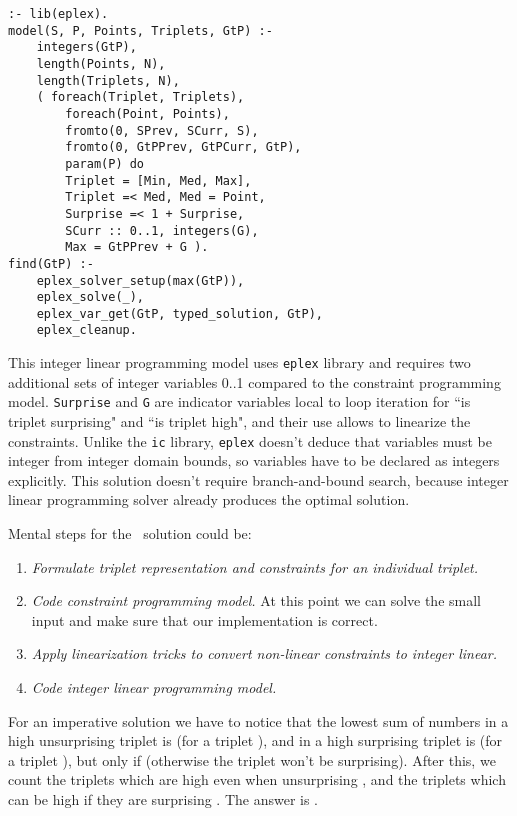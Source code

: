 \documentclass{acm_proc_article-sp}
\begin{document}
\begin{lstlisting}[caption={Integer programming solution for ``Dancing With the Googlers''}]
:- lib(eplex).
model(S, P, Points, Triplets, GtP) :-
    integers(GtP),
    length(Points, N),
    length(Triplets, N),
    ( foreach(Triplet, Triplets), 
        foreach(Point, Points), 
        fromto(0, SPrev, SCurr, S), 
        fromto(0, GtPPrev, GtPCurr, GtP), 
        param(P) do
        Triplet = [Min, Med, Max], 
        Triplet =< Med, Med = Point,
        Surprise =< 1 + Surprise,
        SCurr :: 0..1, integers(G),
        Max = GtPPrev + G ).
find(GtP) :-
    eplex_solver_setup(max(GtP)),
    eplex_solve(_),
    eplex_var_get(GtP, typed_solution, GtP),
    eplex_cleanup.
\end{lstlisting}

This integer linear programming model uses \texttt{eplex} library and requires two additional sets of integer variables 0..1 compared to the constraint programming model. 
\texttt{Surprise} and \texttt{G} are indicator variables local to loop iteration for ``is triplet surprising" and ``is triplet high", and their use allows to linearize the constraints. 
Unlike the \texttt{ic} library, \texttt{eplex} doesn't deduce that variables must be integer from integer domain bounds, so variables have to be declared as integers explicitly.
This solution doesn't require branch-and-bound search, because integer linear programming solver already produces the optimal solution. 

Mental steps for the \eclipse\ solution could be:

\begin{enumerate}
\item \textit{Formulate triplet representation and constraints for an individual triplet.}
\item \textit{Code constraint programming model.} 
At this point we can solve the small input and make sure that our implementation is correct.
\item \textit{Apply linearization tricks to convert non-linear constraints to integer linear.}
\item \textit{Code integer linear programming model.}
\end{enumerate}

For an imperative solution we have to notice that the lowest sum of
numbers in a high unsurprising triplet is  (for a triplet ), 
and in a high surprising triplet is  (for a triplet ), but only
if  (otherwise the triplet won't be surprising). After this, we
count the triplets which are high even when unsurprising ,
and the triplets which can be high if they are surprising .
The answer is .
\end{document}
